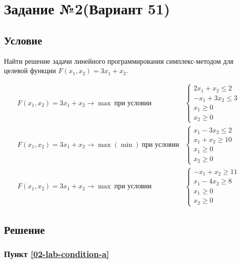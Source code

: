 \section{Задание №2(Вариант 51)}\label{02-lab}

\subsection{Условие}

Найти решение задачи линейного программирования симплекс-методом для целевой функции $F(x_1, x_2) = 3x_1 + x_2$.

\begin{align}
    F(x_1, x_2) = 3x_1 + x_2 \to \max\ \text{при условии} &
    \begin{cases}
        2x_1 + x_2 \leq 2\\
        -x_1 + 3x_2 \leq 3\\
        x_1 \geq 0\\
        x_2 \geq 0
    \end{cases}\tag{А}\label{02-lab-condition-a}\\
    F(x_1, x_2) = 3x_1 + x_2 \to \max(\min)\ \text{при условии} &
    \begin{cases}
        x_1 - 3x_2 \leq 2 \\
        x_1 + x_2 \geq 10 \\
        x_1 \geq 0 \\
        x_2 \geq 0
    \end{cases}\tag{Б}\label{02-lab-condition-b}\\
    F(x_1, x_2) = 3x_1 + x_2 \to \max\ \text{при условии} &
    \begin{cases}
        -x_1 + x_2 \geq 11\\
        x_1 - 4x_2 \geq 8\\
        x_1 \geq 0\\
        x_2 \geq 0
    \end{cases}\tag{В}
    \label{02-lab-condition-c}
\end{align}

\subsection{Решение}\label{02-lab-solution}
\subsubsection{Пункт \ref{02-lab-condition-a}}\label{02-lab-a}

